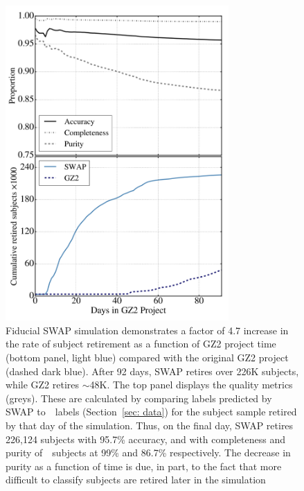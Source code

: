 \begin{figure}[t!]
\includegraphics[width=3.35in]{Figures/human_machine/f3.pdf}
\caption[Reprocessing GZ2 data with SWAP results in a factor of 4.7 increase in the classification rate.]{Fiducial SWAP simulation demonstrates a factor of 4.7 increase in the rate of subject retirement as a function of GZ2 project time (bottom panel, light blue) compared with the original GZ2 project (dashed dark blue). After 92 days, SWAP retires over 226K subjects, while GZ2 retires $\sim$48K.  The top panel displays the quality metrics (greys). These are calculated by comparing labels predicted by SWAP to~\raw~labels (Section~\ref{sec: data}) for the subject sample retired by that day of the simulation. Thus, on the final day, SWAP retires 226,124 subjects with 95.7\% accuracy,  and with completeness and purity of~\feat~subjects at 99\% and 86.7\% respectively. The decrease in purity as a function of time is due, in part, to the fact that more difficult to classify subjects are retired later in the simulation 
\label{fig: fiducial run}}
\end{figure}


